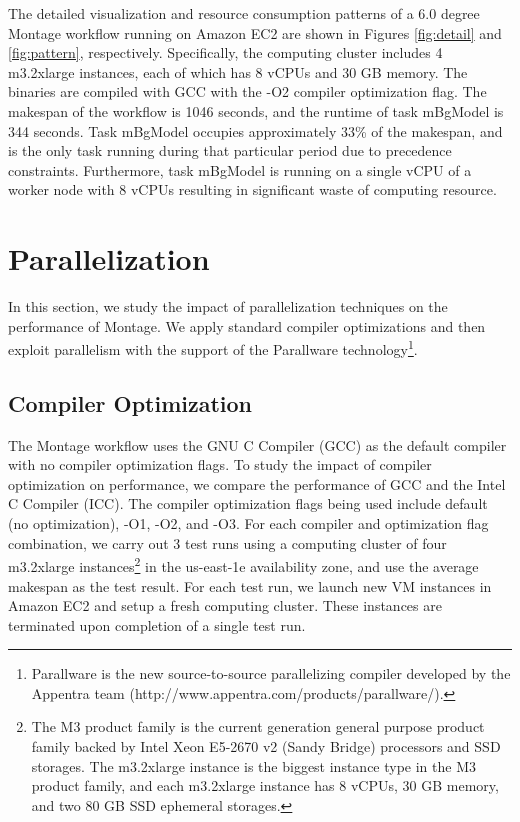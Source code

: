 The detailed visualization and  resource consumption patterns of a 6.0 degree Montage workflow running on Amazon EC2 are shown in Figures \ref{fig:detail} and \ref{fig:pattern}, respectively. Specifically, the computing cluster includes 4 m3.2xlarge instances, each of which has 8 vCPUs and 30 GB memory. The binaries are compiled with GCC with the -O2 compiler optimization flag. The makespan of the workflow is 1046 seconds, and the runtime of task mBgModel is 344 seconds. Task mBgModel occupies approximately 33\% of the makespan, and is the only task running during that particular period due to precedence constraints. Furthermore, task mBgModel is running on a single vCPU of a worker node with 8 vCPUs resulting in significant waste of computing resource. 


\section{Parallelization}
\label{sec:parallel}

In this section, we study the impact of parallelization techniques on the performance of Montage. We apply standard compiler optimizations and then exploit parallelism with the support of the Parallware technology\footnote{Parallware is the new source-to-source parallelizing compiler developed by the Appentra team  (http://www.appentra.com/products/parallware/).}. 


\subsection{Compiler Optimization}
\label{sec:compiler}
The Montage workflow uses the GNU C Compiler (GCC) as the default compiler with no compiler optimization flags. To study the impact of compiler optimization on performance, we compare the performance of GCC and the Intel C Compiler (ICC). The compiler optimization flags being used include default (no optimization), -O1, -O2, and -O3. For each compiler and optimization flag combination, we carry out 3 test runs using a computing cluster of four m3.2xlarge instances\footnote{The M3 product family is the current generation general purpose product family backed by Intel Xeon E5-2670 v2 (Sandy Bridge) processors and SSD storages. The m3.2xlarge instance is the biggest instance type in the M3 product family, and each m3.2xlarge instance has 8 vCPUs, 30 GB memory, and two 80 GB SSD ephemeral storages.} in the us-east-1e availability zone, and use the average makespan as the test result. For each test run, we launch new VM instances in Amazon EC2 and setup a fresh computing cluster. These instances are terminated upon completion of a single test run. 

